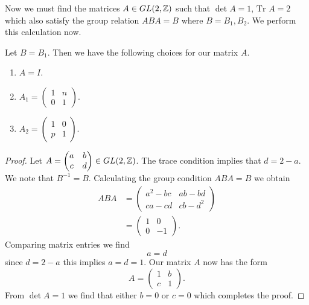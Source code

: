 Now we must find the matrices $A \in GL(2, \mathbb{Z})$ such that $\det A = 1$,
$\text{Tr } A = 2$ which also satisfy the group relation $ABA = B$ where $B=
    B_1,B_2$. We perform this calculation now.

\begin{prop}
    Let $B = B_1$. Then we have the following choices for our matrix $A$.
    \begin{enumerate}
        \item $A = I$.
        \item $A_1 = \begin{pmatrix}
                      1 & n \\
                      0 & 1
                  \end{pmatrix}$.
        \item $A_2 = \begin{pmatrix}
                      1 & 0 \\
                      p & 1
                  \end{pmatrix}$.
    \end{enumerate}
\end{prop}

\begin{proof}
    Let $A = \begin{pmatrix}
            a & b \\
            c & d
        \end{pmatrix} \in GL(2, \mathbb{Z})$. The trace condition implies that $d = 2-a$. We note that $B^{-1} = B$. Calculating the
    group condition $ABA = B$ we obtain
    \begin{align*}
        ABA & = \begin{pmatrix}
                    a^2 - bc & ab-bd    \\
                    ca -cd   & cb - d^2
                \end{pmatrix} \\
            & = \begin{pmatrix}
                    1 & 0  \\
                    0 & -1
                \end{pmatrix}.
    \end{align*}
    Comparing matrix entries we find
    $$a = d $$
    since $d = 2-a$ this implies $a=d=1$. Our matrix $A$ now has the form
    $$
        A = \begin{pmatrix}
            1 & b \\
            c & 1
        \end{pmatrix}.
    $$
    From $\det A = 1$ we find that either $b=0$ or $c = 0$ which completes the proof.
\end{proof}

